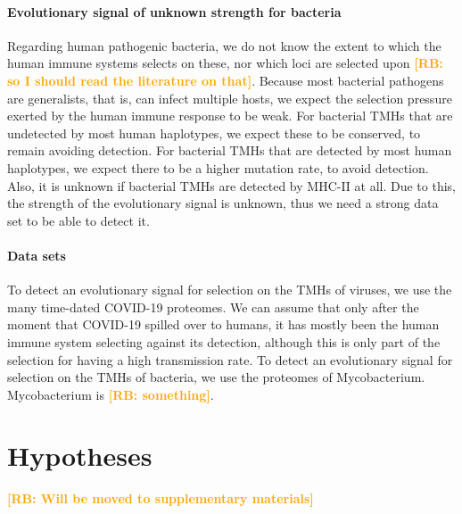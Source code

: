 \documentclass{article}
\newcommand{\richel}[1]{\textcolor{orange}{\textbf{[RB: #1]}}}
\begin{document}
\paragraph{Evolutionary signal of unknown strength for bacteria}


Regarding human pathogenic bacteria, we do not know the extent to which the 
human immune systems selects on these, nor which loci are selected
upon \richel{so I should read the literature on that}.
Because most bacterial pathogens are generalists, that is,
can infect multiple hosts, we expect the selection pressure exerted
by the human immune response to be weak.
For bacterial TMHs that are undetected by most human haplotypes, we
expect these to be conserved, to remain avoiding detection.
For bacterial TMHs that are detected by most human haplotypes, we
expect there to be a higher mutation rate, to avoid detection.
Also, it is unknown if bacterial TMHs are detected by MHC-II at all.
Due to this, the strength of the evolutionary signal is unknown,
thus we need a strong data set to be able to detect it.

\paragraph{Data sets}


To detect an evolutionary signal for selection on the TMHs of viruses, 
we use the many time-dated COVID-19 proteomes.
We can assume that only after the moment that COVID-19 spilled over 
to humans, it has mostly been the human immune system selecting against
its detection, although this is only part of the selection for 
having a high transmission rate.
To detect an evolutionary signal for selection on the TMHs of bacteria, 
we use the proteomes of Mycobacterium. Mycobacterium is \richel{something}.


\section{Hypotheses}

\richel{Will be moved to supplementary materials}
\end{document}
